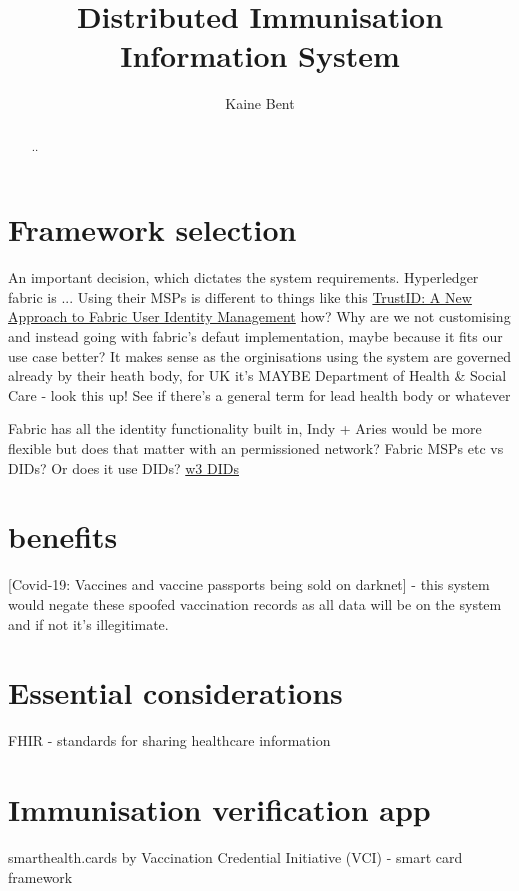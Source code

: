 \documentclass{article}
\title{Distributed Immunisation Information System}
\author{Kaine Bent}
\begin{document}
\begin{titlepage}
\maketitle
\end{titlepage}

\begin{abstract}
..
\end{abstract}

\begin{flushleft}

\section{Framework selection}
An important decision, which dictates the system requirements. Hyperledger fabric is ... Using their MSPs is different to things like this \href{'https://www.hyperledger.org/blog/2020/04/21/trustid-a-new-approach-to-fabric-user-identity-management'}{TrustID: A New Approach to Fabric User Identity Management} how? Why are we not customising and instead going with fabric's defaut implementation, maybe because it fits our use case better? It makes sense as the orginisations using the system are governed already by their heath body, for UK it's MAYBE Department of Health & Social Care - look this up! See if there's a general term for lead health body or whatever

Fabric has all the identity functionality built in, Indy + Aries would be more flexible but does that matter with an permissioned network? Fabric MSPs etc vs DIDs? Or does it use DIDs? \href{'https://www.w3.org/TR/did-core/'}{w3 DIDs}

\section{benefits}
[Covid-19: Vaccines and vaccine passports being sold on darknet] - this system would negate these spoofed vaccination records as all data will be on the system and if not it's illegitimate.
\linebreak[3]

\section{Essential considerations}
FHIR - standards for sharing healthcare information

\section{Immunisation verification app}
smarthealth.cards by Vaccination Credential Initiative (VCI) - smart card framework


\end{flushleft}
\end{document}
